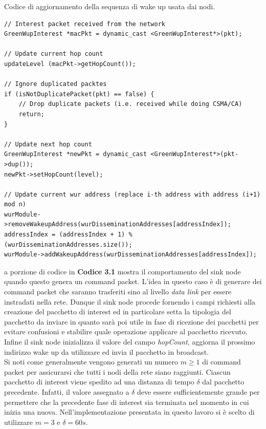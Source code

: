 \documentclass[binding=0.6cm,TFA]{sapthesis}
\begin{document}
\begin{listing}
    \caption{Codice di aggiornamento della sequenza di wake up usata dai nodi.}
    \begin{verbatim}
// Interest packet received from the network
GreenWupInterest *macPkt = dynamic_cast <GreenWupInterest*>(pkt);

// Update current hop count
updateLevel (macPkt->getHopCount());

// Ignore duplicated packtes
if (isNotDuplicatePacket(pkt) == false) {
    // Drop duplicate packets (i.e. received while doing CSMA/CA)
    return;
}

// Update next hop count
GreenWupInterest *newPkt = dynamic_cast <GreenWupInterest*>(pkt->dup());
newPkt->setHopCount(level);

// Update current wur address (replace i-th address with address (i+1) mod n)
wurModule->removeWakeupAddress(wurDisseminationAddresses[addressIndex]);
addressIndex = (addressIndex + 1) % (wurDisseminationAddresses.size());
wurModule->addWakeupAddress(wurDisseminationAddresses[addressIndex]);

    \end{verbatim}
\end{listing}

\let\cleardoublepage    %

La porzione di codice in \textbf{Codice 3.1} mostra il comportamento del sink node quando questo genera un command packet. L'idea in questo caso è
di generare dei command packet che saranno trasferiti sino al livello \emph{data link} per essere instradati nella rete. Dunque il sink node procede
fornendo i campi richiesti alla creazione del pacchetto di interest ed in particolare setta la tipologia del pacchetto da inviare in quanto sarà poi
utile in fase di ricezione dei pacchetti per evitare confusioni e stabilire quale operazione applicare al pacchetto ricevuto.
Infine il sink node inizializza il valore del campo \emph{hopCount}, aggiorna il prossimo indirizzo wake up da utilizzare ed invia il pacchetto in broadcast.\\

\newpage
Si noti come generalmente vengono generati un numero $m \geq 1 $ di command packet per assicurarsi che tutti i nodi della rete siano raggiunti. Ciascun pacchetto
di interest viene spedito ad una distanza di tempo $\delta$ dal pacchetto precedente. Infatti, il valore assegnato a $\delta$ deve essere sufficientemente
grande per permettere che la precedente fase di interest sia terminata nel momento in cui inizia una nuova. Nell'implementazione presentata in questo lavoro
si è scelto di utilizzare $m=3$ e $\delta=60s$.\\
\end{document}
